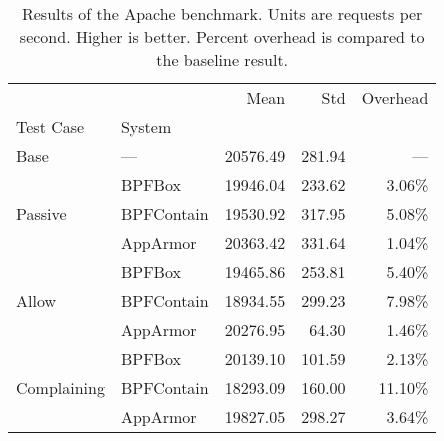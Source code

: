 \begin{table}[ht!]
\centering
\footnotesize
\caption[Results of the Apache benchmark]{Results of the Apache benchmark. Units are requests per second. Higher is better. Percent overhead is compared to the baseline result.}
\label{tab:phoronix-apache}
\begin{tabular}{llrrr}
\toprule
            &          &      Mean &     Std & Overhead \\
Test Case & System &           &         &          \\
\midrule
Base & --- &  20576.49 &  281.94 &      --- \\
\cline{1-5}
\multirow{3}{*}{Passive} & BPFBox &  19946.04 &  233.62 &   3.06\% \\
            & BPFContain &  19530.92 &  317.95 &   5.08\% \\
            & AppArmor &  20363.42 &  331.64 &   1.04\% \\
\cline{1-5}
\multirow{3}{*}{Allow} & BPFBox &  19465.86 &  253.81 &   5.40\% \\
            & BPFContain &  18934.55 &  299.23 &   7.98\% \\
            & AppArmor &  20276.95 &   64.30 &   1.46\% \\
\cline{1-5}
\multirow{3}{*}{Complaining} & BPFBox &  20139.10 &  101.59 &   2.13\% \\
            & BPFContain &  18293.09 &  160.00 &  11.10\% \\
            & AppArmor &  19827.05 &  298.27 &   3.64\% \\
\bottomrule
\end{tabular}
\end{table}
